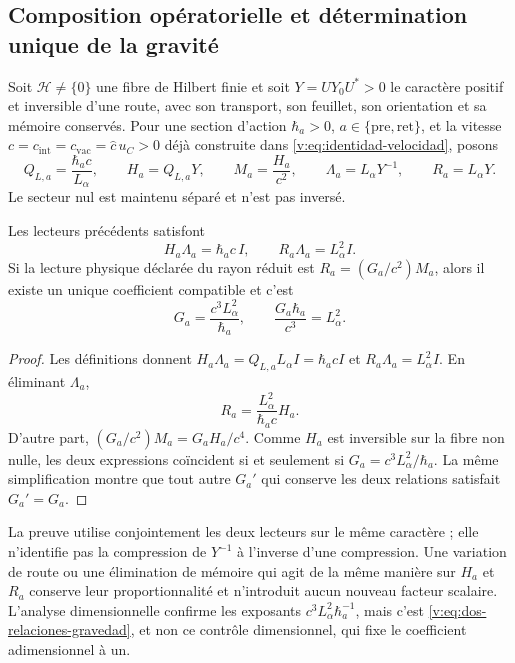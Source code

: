 \subsection{Composition opératorielle et détermination unique de la gravité}

Soit $\mathcal H\ne\{0\}$ une fibre de Hilbert finie et soit $Y=UY_0U^*>0$
le caractère positif et inversible d’une route, avec son transport, son feuillet,
son orientation et sa mémoire conservés. Pour une section d’action
$\hbar_a>0$, $a\in\{\mathrm{pre},\mathrm{ret}\}$, et la vitesse
$c=c_{\mathrm{int}}=c_{\mathrm{vac}}=\widehat c\,u_C>0$ déjà construite dans
\eqref{v:eq:identidad-velocidad}, posons
\begin{equation}
 Q_{L,a}=\frac{\hbar_ac}{L_\alpha},\qquad
 H_a=Q_{L,a}Y,\qquad M_a=\frac{H_a}{c^2},\qquad
 \Lambda_a=L_\alpha Y^{-1},\qquad R_a=L_\alpha Y.
 \label{v:eq:lectores-longitud-accion}
\end{equation}
Le secteur nul est maintenu séparé et n’est pas inversé.

\begin{theorem}
\label{v:thm:gravedad-unica-alpha}
Les lecteurs précédents satisfont
\begin{equation}
 H_a\Lambda_a=\hbar_ac\,I,\qquad
 R_a\Lambda_a=L_\alpha^2I.
 \label{v:eq:dos-relaciones-gravedad}
\end{equation}
Si la lecture physique déclarée du rayon réduit est
$R_a=(G_a/c^2)M_a$, alors il existe un unique coefficient compatible et c’est
\begin{equation}
 \boxed{G_a=\frac{c^3L_\alpha^2}{\hbar_a}},
 \qquad
 \boxed{\frac{G_a\hbar_a}{c^3}=L_\alpha^2}.
 \label{v:eq:gravedad-unica-alpha}
\end{equation}
\end{theorem}
\begin{proof}
Les définitions donnent
$H_a\Lambda_a=Q_{L,a}L_\alpha I=\hbar_acI$ et
$R_a\Lambda_a=L_\alpha^2I$. En éliminant $\Lambda_a$,
\[
 R_a=\frac{L_\alpha^2}{\hbar_ac}H_a.
\]
D’autre part,
$(G_a/c^2)M_a=G_aH_a/c^4$. Comme $H_a$ est inversible sur la fibre
non nulle, les deux expressions coïncident si et seulement si
$G_a=c^3L_\alpha^2/\hbar_a$. La même simplification montre que tout
autre $G_a'$ qui conserve les deux relations satisfait $G_a'=G_a$.
\end{proof}

La preuve utilise conjointement les deux lecteurs sur le même caractère ; elle
n’identifie pas la compression de $Y^{-1}$ à l’inverse d’une compression. Une
variation de route ou une élimination de mémoire qui agit de la même manière
sur $H_a$ et $R_a$ conserve leur proportionnalité et n’introduit aucun nouveau
facteur scalaire. L’analyse dimensionnelle confirme les exposants
$c^3L_\alpha^2\hbar_a^{-1}$, mais c’est
\eqref{v:eq:dos-relaciones-gravedad}, et non ce contrôle dimensionnel, qui
fixe le coefficient adimensionnel à un.

